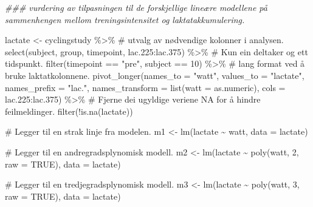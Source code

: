 \documentclass[
  letterpaper,
  DIV=11,
  numbers=noendperiod]{scrreprt}
\newenvironment{Shaded}{\begin{snugshade}}{\end{snugshade}}
\newcommand{\AttributeTok}[1]{\textcolor[rgb]{0.40,0.45,0.13}{#1}}
\newcommand{\CommentTok}[1]{\textcolor[rgb]{0.37,0.37,0.37}{#1}}
\newcommand{\ConstantTok}[1]{\textcolor[rgb]{0.56,0.35,0.01}{#1}}
\newcommand{\DecValTok}[1]{\textcolor[rgb]{0.68,0.00,0.00}{#1}}
\newcommand{\DocumentationTok}[1]{\textcolor[rgb]{0.37,0.37,0.37}{\textit{#1}}}
\newcommand{\FloatTok}[1]{\textcolor[rgb]{0.68,0.00,0.00}{#1}}
\newcommand{\FunctionTok}[1]{\textcolor[rgb]{0.28,0.35,0.67}{#1}}
\newcommand{\NormalTok}[1]{\textcolor[rgb]{0.00,0.23,0.31}{#1}}
\newcommand{\OtherTok}[1]{\textcolor[rgb]{0.00,0.23,0.31}{#1}}
\newcommand{\SpecialCharTok}[1]{\textcolor[rgb]{0.37,0.37,0.37}{#1}}
\newcommand{\StringTok}[1]{\textcolor[rgb]{0.13,0.47,0.30}{#1}}
\begin{document}
\begin{Shaded}
\begin{Highlighting}[]
\DocumentationTok{\#\#\# vurdering av tilpasningen til de forskjellige lineære modellene på sammenhengen mellom treningsintensitet og laktatakkumulering.}

\NormalTok{lactate }\OtherTok{\textless{}{-}}\NormalTok{ cyclingstudy }\SpecialCharTok{\%\textgreater{}\%}
  \CommentTok{\# utvalg av nødvendige kolonner i analysen.}
  \FunctionTok{select}\NormalTok{(subject, group, timepoint, lac}\FloatTok{.225}\SpecialCharTok{:}\NormalTok{lac}\FloatTok{.375}\NormalTok{) }\SpecialCharTok{\%\textgreater{}\%}
  \CommentTok{\# Kun ein deltaker og ett tidspunkt.}
  \FunctionTok{filter}\NormalTok{(timepoint }\SpecialCharTok{==} \StringTok{"pre"}\NormalTok{, subject }\SpecialCharTok{==} \DecValTok{10}\NormalTok{) }\SpecialCharTok{\%\textgreater{}\%}
  \CommentTok{\# lang format ved å bruke laktatkolonnene.}
  \FunctionTok{pivot\_longer}\NormalTok{(}\AttributeTok{names\_to =} \StringTok{"watt"}\NormalTok{,}
               \AttributeTok{values\_to =} \StringTok{"lactate"}\NormalTok{,}
               \AttributeTok{names\_prefix =} \StringTok{"lac."}\NormalTok{,}
               \AttributeTok{names\_transform =} \FunctionTok{list}\NormalTok{(}\AttributeTok{watt =}\NormalTok{ as.numeric),}
               \AttributeTok{cols =}\NormalTok{ lac}\FloatTok{.225}\SpecialCharTok{:}\NormalTok{lac}\FloatTok{.375}\NormalTok{) }\SpecialCharTok{\%\textgreater{}\%}
  \CommentTok{\# Fjerne dei ugyldige veriene NA for å hindre feilmeldinger.}
  \FunctionTok{filter}\NormalTok{(}\SpecialCharTok{!}\FunctionTok{is.na}\NormalTok{(lactate))}

\CommentTok{\# Legger til en strak linje fra modelen.}
\NormalTok{m1 }\OtherTok{\textless{}{-}} \FunctionTok{lm}\NormalTok{(lactate }\SpecialCharTok{\textasciitilde{}}\NormalTok{ watt, }\AttributeTok{data =}\NormalTok{ lactate)}

\CommentTok{\# Legger til en andregradsplynomisk modell.}
\NormalTok{m2 }\OtherTok{\textless{}{-}} \FunctionTok{lm}\NormalTok{(lactate }\SpecialCharTok{\textasciitilde{}} \FunctionTok{poly}\NormalTok{(watt, }\DecValTok{2}\NormalTok{, }\AttributeTok{raw =} \ConstantTok{TRUE}\NormalTok{), }\AttributeTok{data =}\NormalTok{ lactate)}

\CommentTok{\# Legger til en tredjegradsplynomisk modell.}
\NormalTok{m3 }\OtherTok{\textless{}{-}} \FunctionTok{lm}\NormalTok{(lactate }\SpecialCharTok{\textasciitilde{}} \FunctionTok{poly}\NormalTok{(watt, }\DecValTok{3}\NormalTok{, }\AttributeTok{raw =} \ConstantTok{TRUE}\NormalTok{), }\AttributeTok{data =}\NormalTok{ lactate)}


\end{Highlighting}
\end{Shaded}
\end{document}

